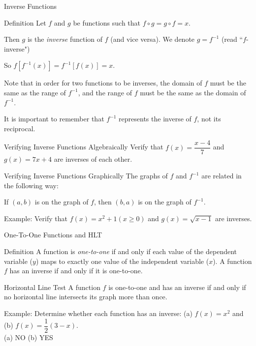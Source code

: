 \documentclass{beamer}
\newcommand{\fp}[1]{\left({#1}\right)} %
\newcommand{\fb}[1]{\left[{#1}\right]} %
\begin{document}
\begin{frame}[t]{Inverse Functions}
\begin{block}{Definition}
Let $f$ and $g$ be functions such that $f\circ g = g\circ f = x$. \vspace{12pt}

Then $g$ is the \textit{inverse} function of $f$ (and vice versa). We denote $g = f^{-1}$ (read ``$f$-inverse") \vspace{12pt}

So $f\fb{f^{-1}(x)} = f^{-1}\fb{f(x)} = x$. \vspace{12pt}

Note that in order for two functions to be inverses, the domain of $f$ must be the same as the range of $f^{-1}$, and the range of $f$ must be the same as the domain of $f^{-1}$.
\end{block}

\pause

It is important to remember that $f^{-1}$ represents the inverse of $f$, not its reciprocal.
\end{frame}

\begin{frame}[t]{Verifying Inverse Functions Algebraically}
Verify that $f(x) = \dfrac{x-4}{7}$ and $g(x) = 7x + 4$ are inverses of each other.

\end{frame}

\begin{frame}[t]{Verifying Inverse Functions Graphically}
The graphs of $f$ and $f^{-1}$ are related in the following way:
\pause

If $(a,b)$ is on the graph of $f$, then $(b,a)$ is on the graph of $f^{-1}$.

Example: Verify that $f(x) = x^2 + 1 (x\geq 0)$ and $g(x) = \sqrt{x-1}$ are inverses.
\end{frame}

\begin{frame}[t]{One-To-One Functions and HLT}
\begin{block}{Definition}
A function is \textit{one-to-one} if and only if each value of the dependent variable ($y$) maps to exactly one value of the independent variable ($x$). A function $f$ has an inverse if and only if it is one-to-one.
\end{block}

\pause

\begin{block}{Horizontal Line Test}
A function $f$ is one-to-one and has an inverse if and only if no horizontal line intersects its graph more than once.
\end{block}

\pause

Example: Determine whether each function has an inverse: (a) $f(x) = x^2$ and (b) $f(x) = \dfrac12\fp{3-x}$. \pause \\ (a) NO \hspace{1in} (b) YES
\end{frame}
\end{document}
